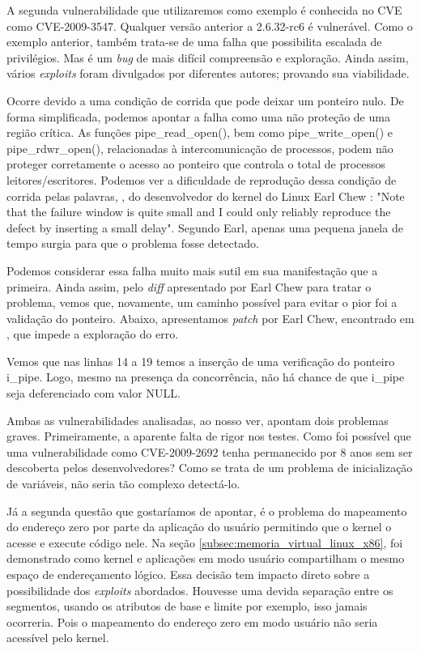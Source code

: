 			
			A segunda vulnerabilidade que utilizaremos como exemplo é conhecida no CVE como CVE-2009-3547.
			Qualquer versão anterior a 2.6.32-rc6 é vulnerável.
			Como o exemplo anterior, também trata-se de uma falha que possibilita escalada de privilégios.
			Mas é um \textsl{bug} de mais difícil compreensão e exploração. Ainda assim, vários \textsl{exploits}
			foram divulgados por diferentes autores; provando sua viabilidade.

			
			Ocorre devido a uma condição de corrida que pode deixar	um ponteiro nulo. De forma simplificada,
			podemos apontar a falha como uma não proteção de uma região crítica. As funções
			pipe\_read\_open(), bem como pipe\_write\_open() e pipe\_rdwr\_open(), relacionadas à intercomunicação
			de processos, podem não proteger corretamente o acesso ao ponteiro que controla o total de
			processos leitores/escritores. Podemos ver a dificuldade de reprodução dessa condição de corrida pelas
			palavras, \cite{git_kernel_org_cve2009_3547}, do desenvolvedor do kernel do Linux Earl Chew :
			"Note that the failure window is quite small and I could only
			reliably reproduce the defect by inserting a small delay".
			Segundo Earl, apenas uma pequena janela de tempo surgia para que o problema fosse detectado.
			
	
			Podemos considerar essa falha muito mais sutil em sua manifestação que a primeira.
			Ainda assim, pelo \textsl{diff} apresentado por Earl Chew para tratar o problema,
			vemos que, novamente, um caminho possível para evitar o pior foi a validação do ponteiro.
			Abaixo, apresentamos \textsl{patch} por Earl Chew, encontrado em \cite{git_kernel_org_cve2009_3547}, 
			que impede a exploração do erro.
			
			Vemos que nas linhas 14 a 19 temos a inserção de uma verificação do ponteiro i\_pipe.
			Logo, mesmo na presença da concorrência, não há chance de que i\_pipe seja deferenciado com valor NULL.
			
			
			Ambas as vulnerabilidades analisadas, ao nosso ver, apontam dois problemas graves.
			Primeiramente, a aparente falta de rigor nos testes. Como foi possível
			que uma vulnerabilidade como CVE-2009-2692 tenha permanecido por 8 anos sem ser descoberta
			pelos desenvolvedores? Como se trata de um problema de inicialização de variáveis,
			não seria tão complexo detectá-lo.
			
			
			Já a segunda questão que gostaríamos de apontar, é o problema do mapeamento do endereço
			zero por parte da aplicação do usuário permitindo que o kernel o acesse e execute
			código nele. Na seção \ref{subsec:memoria_virtual_linux_x86}, foi demonstrado como
			kernel e aplicações em modo usuário compartilham o mesmo espaço de endereçamento lógico.
			Essa decisão tem impacto direto sobre a possibilidade dos \textsl{exploits} abordados.
			Houvesse uma devida separação entre os segmentos, usando
			os atributos de base e limite por exemplo, isso jamais ocorreria. Pois o mapeamento
			do endereço zero em modo usuário não seria acessível pelo kernel.
			

